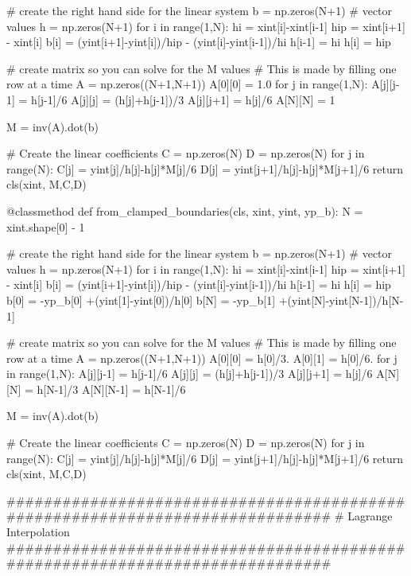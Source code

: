 \documentclass{homework}
\begin{document}
\begin{python}
        # create the right  hand side for the linear system
        b = np.zeros(N+1)
        #  vector values
        h = np.zeros(N+1)
        for i in range(1,N):
            hi = xint[i]-xint[i-1]
            hip = xint[i+1] - xint[i]
            b[i] = (yint[i+1]-yint[i])/hip - (yint[i]-yint[i-1])/hi
            h[i-1] = hi
            h[i] = hip

        #  create matrix so you can solve for the M values
        # This is made by filling one row at a time
        A = np.zeros((N+1,N+1))
        A[0][0] = 1.0
        for j in range(1,N):
            A[j][j-1] = h[j-1]/6
            A[j][j] = (h[j]+h[j-1])/3
            A[j][j+1] = h[j]/6
        A[N][N] = 1

        M  = inv(A).dot(b)

        #  Create the linear coefficients
        C = np.zeros(N)
        D = np.zeros(N)
        for j in range(N):
            C[j] = yint[j]/h[j]-h[j]*M[j]/6
            D[j] = yint[j+1]/h[j]-h[j]*M[j+1]/6
        return cls(xint, M,C,D)

    @classmethod
    def from_clamped_boundaries(cls, xint, yint, yp_b):
        N = xint.shape[0] - 1

        #    create the right  hand side for the linear system
        b = np.zeros(N+1)
        #  vector values
        h = np.zeros(N+1)
        for i in range(1,N):
            hi = xint[i]-xint[i-1]
            hip = xint[i+1] - xint[i]
            b[i] = (yint[i+1]-yint[i])/hip - (yint[i]-yint[i-1])/hi
            h[i-1] = hi
            h[i] = hip
        b[0]  = -yp_b[0] +(yint[1]-yint[0])/h[0]
        b[N] = -yp_b[1] +(yint[N]-yint[N-1])/h[N-1]

        #  create matrix so you can solve for the M values
        # This is made by filling one row at a time
        A = np.zeros((N+1,N+1))
        A[0][0] = h[0]/3.
        A[0][1] = h[0]/6.
        for j in range(1,N):
            A[j][j-1] = h[j-1]/6
            A[j][j] = (h[j]+h[j-1])/3
            A[j][j+1] = h[j]/6
        A[N][N] = h[N-1]/3
        A[N][N-1] = h[N-1]/6

        M  = inv(A).dot(b)

        #  Create the linear coefficients
        C = np.zeros(N)
        D = np.zeros(N)
        for j in range(N):
            C[j] = yint[j]/h[j]-h[j]*M[j]/6
            D[j] = yint[j+1]/h[j]-h[j]*M[j+1]/6
        return cls(xint, M,C,D)


##############################################################################
# Lagrange Interpolation
##############################################################################



\end{python}
\end{document}
